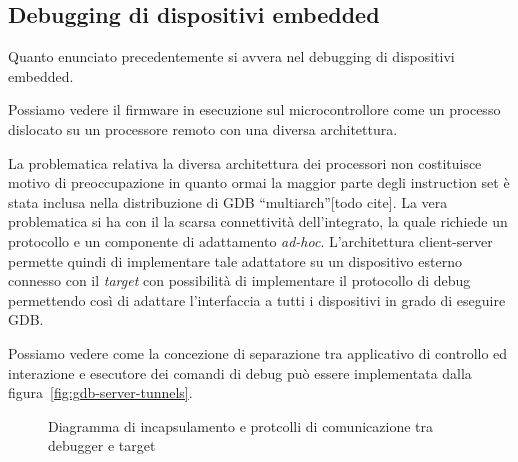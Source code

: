\subsection{Debugging di dispositivi embedded}

Quanto enunciato precedentemente si avvera nel debugging di dispositivi embedded. 

Possiamo vedere il firmware in esecuzione sul microcontrollore come un processo dislocato su un processore remoto con una diversa architettura.

La problematica relativa la diversa architettura dei processori non costituisce motivo di preoccupazione in quanto ormai la maggior parte degli instruction set è stata inclusa nella distribuzione di GDB ``multiarch''[todo cite].
La vera problematica si ha con il la scarsa connettività dell'integrato, la quale richiede un protocollo e un componente di adattamento \textit{ad-hoc}.
L'architettura client-server permette quindi di implementare tale adattatore su un dispositivo esterno connesso con il \textit{target} con possibilità di implementare il protocollo di debug permettendo così di adattare l'interfaccia a tutti i dispositivi in grado di eseguire GDB.

Possiamo vedere come la concezione di separazione tra applicativo di controllo ed interazione e esecutore dei comandi di debug può essere implementata dalla figura~\ref{fig:gdb-server-tunnels}.


\begin{figure}
    \centering
    \caption[]{Diagramma di incapsulamento e protcolli di comunicazione tra debugger e target}
\end{figure}

